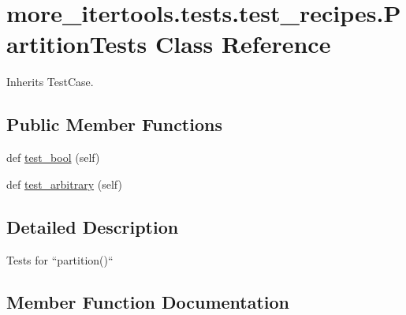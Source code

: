 \hypertarget{classmore__itertools_1_1tests_1_1test__recipes_1_1_partition_tests}{}\section{more\+\_\+itertools.\+tests.\+test\+\_\+recipes.\+Partition\+Tests Class Reference}
\label{classmore__itertools_1_1tests_1_1test__recipes_1_1_partition_tests}


Inherits Test\+Case.

\subsection*{Public Member Functions}
\begin{DoxyCompactItemize}
\item 
def \hyperlink{classmore__itertools_1_1tests_1_1test__recipes_1_1_partition_tests_a2f02ea765f6749adf546efe1950f8aa9}{test\+\_\+bool} (self)
\item 
def \hyperlink{classmore__itertools_1_1tests_1_1test__recipes_1_1_partition_tests_a2d273261165ee6842ad0b29f464c8dd2}{test\+\_\+arbitrary} (self)
\end{DoxyCompactItemize}


\subsection{Detailed Description}
\begin{DoxyVerb}Tests for ``partition()``\end{DoxyVerb}
 

\subsection{Member Function Documentation}
\mbox{\label{classmore__itertools_1_1tests_1_1test__recipes_1_1_partition_tests_a2d273261165ee6842ad0b29f464c8dd2}} 
